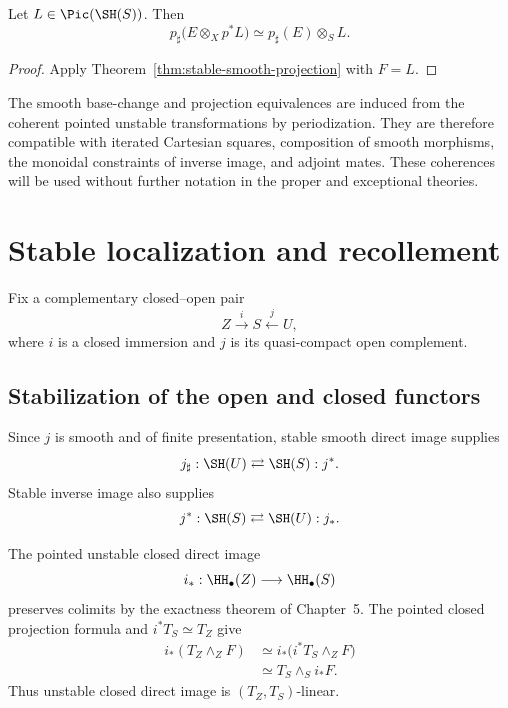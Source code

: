 \begin{corollary}
\label{cor:p-sharp-pullback-twist-preliminary}
Let $L\in\Pic(\SH(S))$.  Then
\[
    p_\sharp\bigl(E\otimes_Xp^*L\bigr)
    \simeq
    p_\sharp(E)\otimes_SL.
\]
\end{corollary}

\begin{proof}
Apply Theorem~\ref{thm:stable-smooth-projection} with $F=L$.
\end{proof}

\begin{remark}[Coherence]
\label{rem:smooth-exchange-coherence}
The smooth base-change and projection equivalences are induced from the coherent pointed unstable
transformations by periodization.  They are therefore compatible with iterated Cartesian squares,
composition of smooth morphisms, the monoidal constraints of inverse image, and adjoint mates.
These coherences will be used without further notation in the proper and exceptional theories.
\end{remark}

\section{Stable localization and recollement}
\label{sec:stable-localization}

Fix a complementary closed--open pair
\[
    Z\xrightarrow{i}S\xleftarrow{j}U,
\]
where $i$ is a closed immersion and $j$ is its quasi-compact open complement.

\subsection{Stabilization of the open and closed functors}

Since $j$ is smooth and of finite presentation, stable smooth direct image supplies
\[
    j_\sharp:\SH(U)
    \rightleftarrows
    \SH(S):j^*.
\]
Stable inverse image also supplies
\[
    j^*:\SH(S)
    \rightleftarrows
    \SH(U):j_*.
\]

The pointed unstable closed direct image
\[
    i_*:\HH_\bullet(Z)\longrightarrow\HH_\bullet(S)
\]
preserves colimits by the exactness theorem of Chapter~5.  The pointed closed projection formula
and $i^*T_S\simeq T_Z$ give
\[
\begin{aligned}
    i_*(T_Z\wedge_ZF)
    &\simeq
    i_*\bigl(i^*T_S\wedge_ZF\bigr) \\
    &\simeq
    T_S\wedge_Si_*F.
\end{aligned}
\]
Thus unstable closed direct image is $(T_Z,T_S)$-linear.


